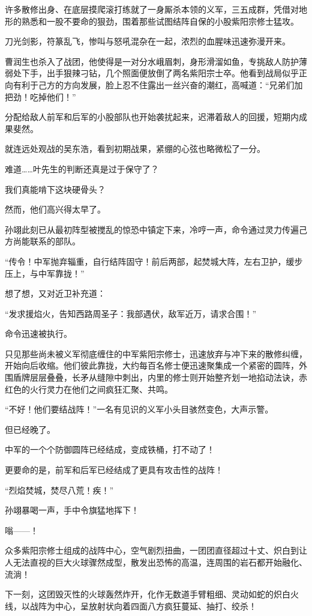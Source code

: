许多散修出身、在底层摸爬滚打练就了一身厮杀本领的义军，三五成群，凭借对地形的熟悉和一股不要命的狠劲，围着那些试图结阵自保的小股紫阳宗修士猛攻。

刀光剑影，符篆乱飞，惨叫与怒吼混杂在一起，浓烈的血腥味迅速弥漫开来。

曹润生也杀入了战团，他使得是一对分水峨眉刺，身形滑溜如鱼，专挑敌人防护薄弱处下手，出手狠辣刁钻，几个照面便放倒了两名紫阳宗士卒。他看到战局似乎正向有利于己方的方向发展，脸上忍不住露出一丝兴奋的潮红，高喊道：“兄弟们加把劲！吃掉他们！”

分配给敌人前军和后军的小股部队也开始袭扰起来，迟滞着敌人的回援，短期内成果斐然。

就连远处观战的吴东浩，看到初期战果，紧绷的心弦也略微松了一分。

难道……叶先生的判断还真是过于保守了？

我们真能啃下这块硬骨头？

然而，他们高兴得太早了。

孙翊此刻已从最初阵型被搅乱的惊恐中镇定下来，冷哼一声，命令通过灵力传遍己方尚能联系的部队。

“传令！中军抛弃辎重，自行结阵固守！前后两部，起焚城大阵，左右卫护，缓步压上，与中军靠拢！”

想了想，又对近卫补充道：

“发求援焰火，告知西路周圣子：我部遇伏，敌军近万，请求合围！”

命令迅速被执行。

只见那些尚未被义军彻底缠住的中军紫阳宗修士，迅速放弃与冲下来的散修纠缠，开始向后收缩。他们彼此靠拢，大约每百名修士便迅速聚集成一个紧密的圆阵，外围盾牌层层叠叠，长矛从缝隙中刺出，内里的修士则开始整齐划一地掐动法诀，赤红色的火行灵力在他们之间疯狂汇聚、共鸣。

“不好！他们要结战阵！”一名有见识的义军小头目骇然变色，大声示警。

但已经晚了。

中军的一个个防御圆阵已经结成，变成铁桶，打不动了！

更要命的是，前军和后军已经结成了更具有攻击性的战阵！

“烈焰焚城，焚尽八荒！疾！”

孙翊暴喝一声，手中令旗猛地挥下！

嗡——！

众多紫阳宗修士组成的战阵中心，空气剧烈扭曲，一团团直径超过十丈、炽白到让人无法直视的巨大火球骤然成型，散发出恐怖的高温，连周围的岩石都开始融化、流淌！

下一刻，这团毁灭性的火球轰然炸开，化作无数道手臂粗细、灵动如蛇的炽白火线，以战阵为中心，呈放射状向着四面八方疯狂蔓延、抽打、绞杀！

